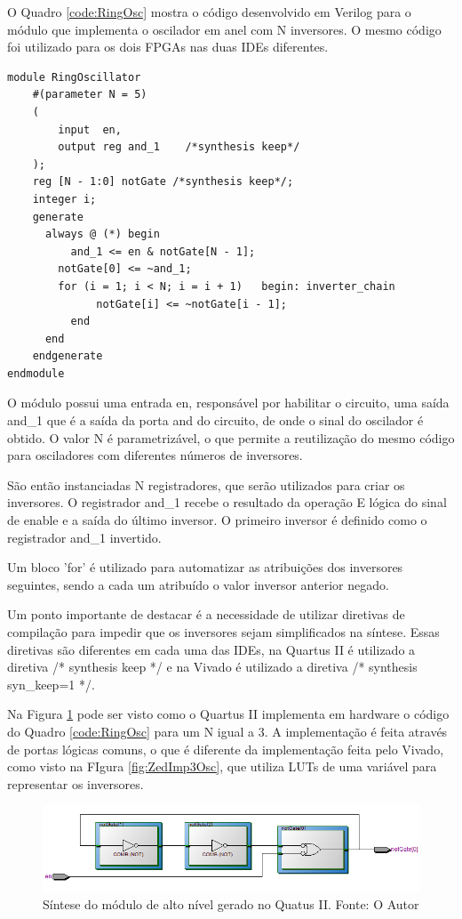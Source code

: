 O Quadro \ref{code:RingOsc} mostra o código desenvolvido em Verilog para o módulo que implementa o oscilador em anel com N inversores. O mesmo código foi utilizado para os dois FPGAs nas duas IDEs diferentes.

\begin{lstlisting}[label={code:RingOsc}, style=VerilogStyle, caption={Módulo do Oscilador em Anel. Fonte: O Autor}]
module RingOscillator 
	#(parameter N = 5)
	(
		input  en,
		output reg and_1    /*synthesis keep*/
	);
	reg [N - 1:0] notGate /*synthesis keep*/;
	integer i;
	generate
	  always @ (*) begin
		  and_1 <= en & notGate[N - 1];
	  	notGate[0] <= ~and_1;
	  	for (i = 1; i < N; i = i + 1)   begin: inverter_chain
			  notGate[i] <= ~notGate[i - 1];
		  end
	  end
	endgenerate
endmodule
\end{lstlisting}

O módulo possui uma entrada en, responsável por habilitar o circuito, uma saída and\_1 que é a saída da porta and do circuito, de onde o sinal do oscilador é obtido. O valor N é parametrizável, o que permite a reutilização do mesmo código para osciladores com diferentes números de inversores.

São então instanciadas N registradores, que serão utilizados para criar os inversores. O registrador and\_1 recebe o resultado da operação E lógica do sinal de enable e a saída do último inversor. O primeiro inversor é definido como o registrador and\_1 invertido.

Um bloco 'for' é utilizado para automatizar as atribuições dos inversores seguintes, sendo a cada um atribuído o valor inversor anterior negado.

Um ponto importante de destacar é a necessidade de utilizar diretivas de compilação para impedir que os inversores sejam simplificados na síntese. Essas diretivas são diferentes em cada uma das IDEs, na Quartus II é utilizado a diretiva /* synthesis keep */ e na Vivado é utilizado a diretiva /* synthesis syn\_keep=1 */.

Na Figura \ref{fig:DE2Imp3Osc} pode ser visto como o Quartus II implementa em hardware o código do Quadro \ref{code:RingOsc} para um N igual a 3. A implementação é feita através de portas lógicas comuns, o que é diferente da implementação feita pelo Vivado, como visto na FIgura \ref{fig:ZedImp3Osc}, que utiliza LUTs de uma variável para representar os inversores.

\begin{figure}[H]
    \centering
    \includegraphics[width=\linewidth]{figures/DE2_Implementation_3Inverter_Gates.png}
    \caption{Síntese do módulo de alto nível gerado no Quatus II. Fonte: O Autor}
    \label{fig:DE2Imp3Osc}
\end{figure}

